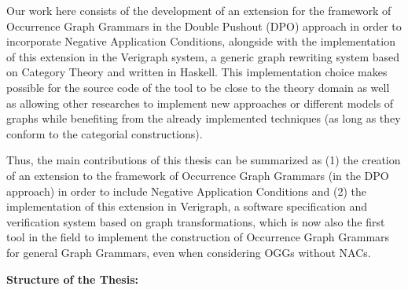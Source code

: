 Our work here consists of the development of an extension for the framework of Occurrence Graph Grammars in the Double Pushout (DPO) approach in order to incorporate Negative Application Conditions, alongside with the implementation of this extension in the Verigraph system, a generic graph rewriting system based on Category Theory and written in Haskell. This implementation choice makes possible for the source code of the tool to be close to the theory domain as well as allowing other researches to implement new approaches or different models of graphs while benefiting from the already implemented techniques (as long as they conform to the categorial constructions).



Thus, the main contributions of this thesis can be summarized as (1) the creation of an extension  to the framework of Occurrence Graph Grammars (in the DPO approach) in order to include Negative Application Conditions and (2) the implementation of this extension in Verigraph, a software specification and verification system based on graph transformations, which is now also the first tool in the field to implement the construction of Occurrence Graph Grammars for general Graph Grammars, even when considering OGGs without NACs.

\hfill \break
\textbf{Structure of the Thesis:}

